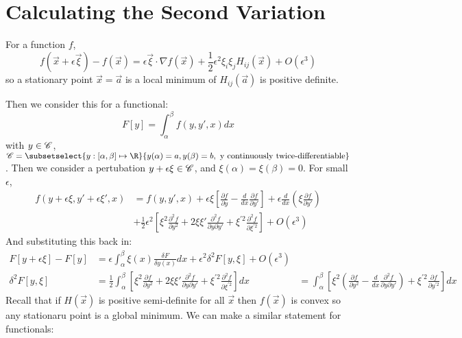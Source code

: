 \documentclass[../Main.tex]{subfiles}
\begin{document}
\section{Calculating the Second Variation}
For a function $f$,
\begin{equation*}
    f(\vec{x} + \epsilon \vec{\xi}) - f(\vec{x}) = \epsilon \vec{\xi} \cdot \nabla f(\vec{x}) + \frac{1}{2} \epsilon^2 \xi_i \xi_j H_{ij}(\vec{x}) + O(\epsilon^3)
\end{equation*}
so a stationary point $\vec{x} = \vec{a}$ is a local minimum of $H_{ij}(\vec{a})$ is positive definite.

Then we consider this for a functional:
\begin{equation*}
    F[y] = \int_\alpha^\beta f(y, y', x) dx
\end{equation*}
with $y \in \mathscr{C}$, $\funcset = \subsetselect{y : [\alpha, \beta] \mapsto \R}{y(\alpha) = a, y(\beta) = b, \text{ y continuously twice-differentiable}}$.
Then we consider a pertubation $y + \epsilon \xi \in \mathscr{C}$, and $\xi(\alpha) = \xi(\beta) = 0$.
For small $\epsilon$,
\begin{align*}
    f(y + \epsilon \xi, y' + \epsilon \xi', x) &= f(y, y', x) + \epsilon \xi \left[\frac{\partial f}{\partial y} - \frac{d}{dx} \frac{\partial f}{\partial y'}\right] + \epsilon \frac{d}{dx}\left(\xi \frac{\partial f}{\partial y'}\right) \\
    &+ \frac{1}{2} \epsilon^2 \left[\xi^2 \frac{\partial^2 f}{\partial y^2} + 2\xi \xi' \frac{\partial^2 f}{\partial y \partial y'} + \xi^{\prime 2} \frac{\partial^2 f}{\partial \xi^{\prime 2}}\right] + O(\epsilon^3)
\end{align*}
And substituting this back in:
\begin{align*}
    F[y + \epsilon \xi] - F[y] &= \epsilon \int_\alpha^\beta \xi(x) \frac{\delta F}{\delta y(x)}dx + \epsilon^2 \delta^2 F[y, \xi] + O(\epsilon^3) \\
    \delta^2 F[y, \xi] &= \frac{1}{2} \int_\alpha^\beta \left[\xi^2 \frac{\partial f}{\partial y^2} + 2\xi\xi' \frac{\partial^2 f}{\partial y \partial y'} + \xi^{\prime 2} \frac{\partial^2 f}{\partial \xi^{\prime 2}}\right]dx
    &= \int_\alpha^\beta \left[\xi^2 \left(\frac{\partial f}{\partial y^2} - \frac{d}{dx} \frac{\partial^2 f}{\partial y \partial y'}\right) + \xi^{\prime 2} \frac{\partial f}{\partial y^{\prime 2}}\right]dx
\end{align*}
Recall that if $H(\vec{x})$ is positive semi-definite for all $\vec{x}$ then $f(\vec{x})$ is convex so any stationaru point is a global minimum. We can make a similar statement for functionals:
\end{document}
